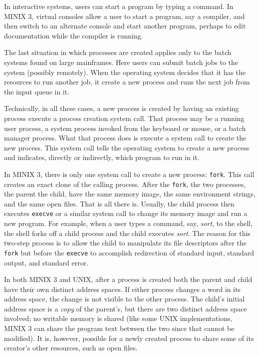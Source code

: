 \documentclass{book}
\newcommand {\sys} [1] {\textsl{#1}}
\newcommand {\cmd} [1] {\texttt{#1}}
\begin{document}
In interactive systems, users can start a program by typing a command.
In MINIX 3, virtual consoles allow a user to start a program, say a compiler, 
and then switch to an alternate console and start another program,
perhaps to edit documentation while the compiler is running.

The last situation in which processes are created applies only to the batch systems found on large mainframes.
Here users can submit batch jobs to the system (possibly remotely).
When the operating system decides that it has the resources to run another job,
it create a new process and runs the next job from the input queue in it.

Technically, in all these cases, a new process is created by having an existing process execute a process creation system call.
That process may be a running user process, 
a system process invoked from the keyboard or mouse,
or a batch manager process.
What that process does is execute a system call to create the new process.
This system call tells the operating system to create a new process and indicates, directly or indirectly,
which program to run in it.

In MINIX 3, there is only one system call to create a new process: \cmd{fork}.
This call creates an exact clone of the calling process.
After the \cmd{fork}, the two processes, the parent the child, have the same memory image, the same environment strings, and the same open files.
That is all there is.
Usually, the child process then executes \cmd{execve} or a similar system call to change its memory image and run a new program.
For example, when a user types a command, say, \sys{sort}, to the shell,
the shell forks off a child process and the child executes \sys{sort}.
The reason for this two-step process is to allow the child to manipulate its file descriptors after the \cmd{fork} 
but before the \cmd{execve} to accomplish redirection of standard input, standard output, and standard error.

In both MINIX 3 and UNIX, after a process is created both the parent and child have their own distinct address spaces.
If either process changes a word in its address space, the change is not visible to the other process.
The child's initial address space is a \sys{copy} of the parent's,
but there are two distinct address space involved; no writable memory is shared (like some UNIX implementations, 
MINIX 3 can share the program text between the two since that cannot be modified).
It is, however, possible for a newly created process to share some of its creator's other resources, such as open files.
\end{document}
